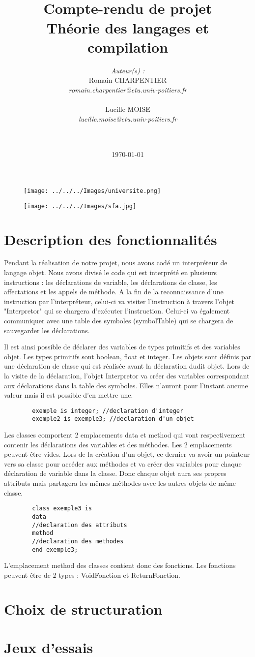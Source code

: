 \documentclass{report}
\title{
	\noindent\hrulefill\\
	\vspace{0.4\baselineskip}	%
	Compte-rendu de projet\\
	{\large Théorie des langages et compilation}\\
	\noindent\hrulefill
	\vspace{2\baselineskip}
}
\author{
	\textit{Auteur(s) :}\\
	Romain CHARPENTIER\\
	\textit{romain.charpentier@etu.univ-poitiers.fr}\\\\
	Lucille MOISE\\
	\textit{lucille.moise@etu.univ-poitiers.fr}\\\\\\
}
\date{\today}
\begin{document}
\lstset{language=C++}
	\begin{figure}
	\vspace{5\baselineskip}
   	 \begin{minipage}[c]{.3\linewidth}
   	     \centering
   	     \texttt{[image: ../../../Images/universite.png]} 
 	   \end{minipage}
  	  \hfill
  	  \begin{minipage}[c]{.3\linewidth}
   	     \centering
    	    \texttt{[image: ../../../Images/sfa.jpg]}
    	\end{minipage}
	\end{figure}
	\maketitle
	\newpage
	\section{Description des fonctionnalités}
	Pendant la réalisation de notre projet, nous avons codé un interpréteur de langage objet. Nous avons divisé le code qui est interprété en plusieurs instructions : les déclarations de variable, les déclarations de classe, les affectations et les appels de méthode. A la fin de la reconnaissance d'une instruction par l'interpréteur, celui-ci va visiter l'instruction à travers l'objet "Interpretor" qui se chargera d'exécuter l'instruction. Celui-ci va également communiquer avec une table des symboles (symbolTable) qui se chargera de sauvegarder les déclarations.\\
	\par
	Il est ainsi possible de déclarer des variables de types primitifs et des variables objet. Les types primitifs sont boolean, float et integer. Les objets sont définis par une déclaration de classe qui est réalisée avant la déclaration dudit objet. Lors de la visite de la déclaration, l'objet Interpretor va créer des variables correspondant aux déclarations dans la table des symboles. Elles n'auront pour l'instant aucune valeur mais il est possible d'en mettre une.
	\begin{lstlisting}
		exemple is integer; //declaration d'integer
		exemple2 is exemple3; //declaration d'un objet
	\end{lstlisting}
	\par
	Les classes comportent 2 emplacements data et method qui vont respectivement contenir les déclarations des variables et des méthodes. Les 2 emplacements peuvent être vides. Lors de la création d'un objet, ce dernier va avoir un pointeur vers sa classe pour accéder aux méthodes et va créer des variables pour chaque déclaration de variable dans la classe. Donc chaque objet aura ses propres attributs mais partagera les mêmes méthodes avec les autres objets de même classe.
	\begin{lstlisting}
		class exemple3 is
		data
		//declaration des attributs
		method
		//declaration des methodes
		end exemple3;
	\end{lstlisting}
	\par 
	L'emplacement method des classes contient donc des fonctions. Les fonctions peuvent être de 2 types : VoidFonction et ReturnFonction.
	\section{Choix de structuration}
	\section{Jeux d'essais}
\end{document}
